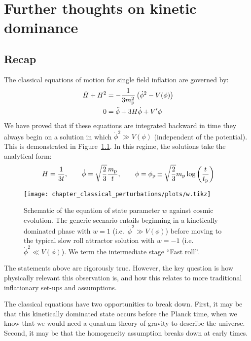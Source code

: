 \chapter{Further thoughts on kinetic dominance}
\label{chap:cls}

\section{Recap}
The classical equations of motion for single field inflation are
governed by:
%
\begin{align}
  \dot{H} + H^2 
  &= - \frac{1}{3m_{\mathrm{p}}^2}\left( \dot{\phi}^2 - V(\phi)\right)
  \label{eqn:raychaudhuri}
  \\
  0 &= \ddot{\phi} + 3H\dot\phi + V^\prime{\phi}
  \label{eqn:kleingordon}
\end{align}
%
We have proved that if these equations are integrated backward in time
they always begin on a solution in which $\dot\phi^2\gg V(\phi)$
(independent of the potential). This is demonstrated in
Figure~\ref{fig:w}. In this regime, the solutions take the analytical
form:
\begin{equation}
  H = \frac{1}{3t},\qquad \dot{\phi} 
  = \sqrt{\frac 2 3}\frac{m_{\mathrm{p}}}{t}, \qquad \phi 
  = \phi_{\mathrm{p}} \pm \sqrt{\frac 2 3}m_{\mathrm{p}} \log\left( \frac t {t_{\mathrm{p}}} \right)
\end{equation}
\begin{figure}[tp]
  \texttt{[image: chapter\_classical\_perturbations/plots/w.tikz]}
  \caption{%
    Schematic of the equation of state parameter $w$ against cosmic
    evolution. The generic scenario entails beginning in a kinetically
    dominated phase with $w=1$ (i.e.\ $\dot{\phi}^2\gg V(\phi)$)
    before moving to the typical slow roll attractor solution with
    $w=-1$ (i.e.\ $\dot{\phi}^2 \ll V(\phi)$). We term the
    intermediate stage ``Fast roll''.\label{fig:w}
  }
\end{figure}

The statements above are rigorously true. However, the key question is how physically relevant this observation is, and how this relates to more traditional inflationary set-ups and assumptions.

The classical equations have two opportunities to break down. First, it may be that this kinetically dominated state occurs before the Planck time, when we know that we would need a quantum theory of gravity to describe the universe. Second, it may be that the homogeneity assumption breaks down at early times.

